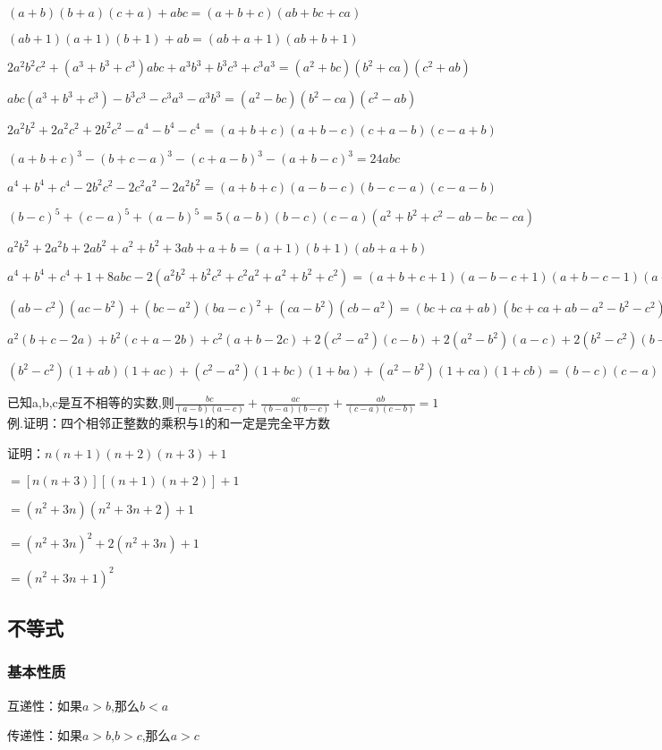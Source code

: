 \documentclass[UTF8]{ctexart}
\begin{document}
$(a+b)(b+a)(c+a)+abc=(a+b+c)(ab+bc+ca)$

$(ab+1)(a+1)(b+1)+ab=(ab+a+1)(ab+b+1)$

$2a^2b^2c^2+(a^3+b^3+c^3)abc+a^3b^3+b^3c^3+c^3a^3=(a^2+bc)(b^2+ca)(c^2+ab)$

$abc(a^3+b^3+c^3)-b^3c^3-c^3a^3-a^3b^3=(a^2-bc)(b^2-ca)(c^2-ab)$

$2a^2b^2+2a^2c^2+2b^2c^2-a^4-b^4-c^4=(a+b+c)(a+b-c)(c+a-b)(c-a+b)$

$(a+b+c)^3-(b+c-a)^3-(c+a-b)^3-(a+b-c)^3=24abc$

$a^4+b^4+c^4-2b^2c^2-2c^2a^2-2a^2b^2=(a+b+c)(a-b-c)(b-c-a)(c-a-b)$

$(b-c)^5+(c-a)^5+(a-b)^5=5(a-b)(b-c)(c-a)(a^2+b^2+c^2-ab-bc-ca)$

$a^2b^2+2a^2b+2ab^2+a^2+b^2+3ab+a+b=(a+1)(b+1)(ab+a+b)$

$a^4+b^4+c^4+1+8abc-2(a^2b^2+b^2c^2+c^2a^2+a^2+b^2+c^2)
=(a+b+c+1)(a-b-c+1)(a+b-c-1)(a-b+c-1)$

$(ab-c^2)(ac-b^2)+(bc-a^2)(ba-c)^2+(ca-b^2)(cb-a^2)
=(bc+ca+ab)(bc+ca+ab-a^2-b^2-c^2)$

$a^2(b+c-2a)+b^2(c+a-2b)+c^2(a+b-2c)+2(c^2-a^2)(c-b)+2(a^2-b^2)(a-c)+2(b^2-c^2)(b-a)
=-3(a-b)(b-c)(c-a)$

$(b^2-c^2)(1+ab)(1+ac)+(c^2-a^2)(1+bc)(1+ba)+(a^2-b^2)(1+ca)(1+cb)=(b-c)(c-a)(a-b)(abc+a+b+c)$

已知a,b,c是互不相等的实数,则$\frac{bc}{(a-b)(a-c)} +\frac{ac}{(b-a)(b-c)} + \frac{ab}{(c-a)(c-b)} =1$
\\

例.证明：四个相邻正整数的乘积与1的和一定是完全平方数

证明：$n(n+1)(n+2)(n+3)+1$

$=[n(n+3)][(n+1)(n+2)]+1$

$=(n^2+3n)(n^2+3n+2)+1$

$=(n^2+3n)^2+2(n^2+3n)+1$

$=(n^2+3n+1)^2$

\subsection{不等式}

\subsubsection{基本性质}

互递性：如果$a> b$,那么$b< a$

传递性：如果$a> b$,$b> c$,那么$a> c$
\end{document}
